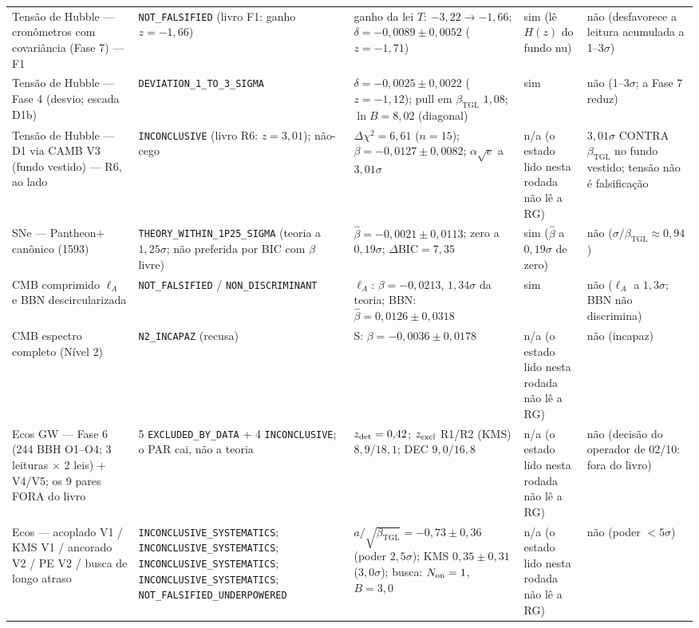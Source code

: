 \documentclass[11pt]{article}
\newcommand{\bTGL}{\beta_{\mathrm{TGL}}}\newcommand{\Msun}{M_{\odot}}\newcommand{\TGL}{\mathrm{TGL}}
\theoremstyle{definition}\newtheorem{deriv}{Derivação}
\begin{document}
\begin{footnotesize}
\begin{longtable}{@{}p{}p{}p{}p{}p{}@{}}
Tensão de Hubble --- cronômetros com covariância (Fase 7) --- F1 & \texttt{NOT\_\allowbreak{}FALSIFIED} (livro F1: ganho $z=-1{,}66$) & ganho da lei $T$: $-3{,}22\to-1{,}66$; $\delta=-0{,}0089\pm0{,}0052$ ($z=-1{,}71$) & sim (lê $H(z)$ do fundo nu) & não (desfavorece a leitura acumulada a 1--3$\sigma$) \\
Tensão de Hubble --- Fase 4 (desvio; escada D1b) & \texttt{DEVIATION\_\allowbreak{}1\_\allowbreak{}TO\_\allowbreak{}3\_\allowbreak{}SIGMA} & $\delta=-0{,}0025\pm0{,}0022$ ($z=-1{,}12$); pull em $\bTGL$ $1{,}08$; $\ln B=8{,}02$ (diagonal) & sim & não (1--3$\sigma$; a Fase 7 reduz) \\
Tensão de Hubble --- D1 via CAMB V3 (fundo vestido) --- R6, ao lado & \texttt{INCONCLUSIVE} (livro R6: $z=3{,}01$); não-cego & $\Delta\chi^2=6{,}61$ ($n=15$); $\beta=-0{,}0127\pm0{,}0082$; $\alpha\sqrt e$ a $3{,}01\sigma$ & n/a (o estado lido nesta rodada não lê a RG) & $3{,}01\sigma$ CONTRA $\bTGL$ no fundo vestido; tensão não é falsificação \\
SNe --- Pantheon+ canônico (1593) & \texttt{THEORY\_\allowbreak{}WITHIN\_\allowbreak{}1P25\_\allowbreak{}SIGMA} (teoria a $1{,}25\sigma$; não preferida por BIC com $\beta$ livre) & $\hat\beta=-0{,}0021\pm0{,}0113$; zero a $0{,}19\sigma$; $\Delta\mathrm{BIC}=7{,}35$ & sim ($\hat\beta$ a $0{,}19\sigma$ de zero) & não ($\sigma/\bTGL\approx0{,}94$) \\
CMB comprimido $\ell_A$ e BBN descircularizada & \texttt{NOT\_\allowbreak{}FALSIFIED} / \texttt{NON\_\allowbreak{}DISCRIMINANT} & $\ell_A$: $\beta=-0{,}0213$, $1{,}34\sigma$ da teoria; BBN: $\hat\beta=0{,}0126\pm0{,}0318$ & sim & não ($\ell_A$ a $1{,}3\sigma$; BBN não discrimina) \\
CMB espectro completo (Nível 2) & \texttt{N2\_\allowbreak{}INCAPAZ} (recusa) & S: $\beta=-0{,}0036\pm0{,}0178$ & n/a (o estado lido nesta rodada não lê a RG) & não (incapaz) \\
Ecos GW --- Fase 6 (244 BBH O1--O4; 3 leituras $\times$ 2 leis) + V4/V5; os 9 pares FORA do livro & 5 \texttt{EXCLUDED\_BY\_DATA} + 4 \texttt{INCONCLUSIVE}; o PAR cai, não a teoria & $z_{\rm det}=0{,}42$; $z_{\rm excl}$ R1/R2 (KMS) $8{,}9$/$18{,}1$; DEC $9{,}0$/$16{,}8$ & n/a (o estado lido nesta rodada não lê a RG) & não (decisão do operador de 02/10: fora do livro) \\
Ecos --- acoplado V1 / KMS V1 / ancorado V2 / PE V2 / busca de longo atraso & \texttt{INCONCLUSIVE\_\allowbreak{}SYSTEMATICS}; \texttt{INCONCLUSIVE\_\allowbreak{}SYSTEMATICS}; \texttt{INCONCLUSIVE\_\allowbreak{}SYSTEMATICS}; \texttt{INCONCLUSIVE\_\allowbreak{}SYSTEMATICS}; \texttt{NOT\_\allowbreak{}FALSIFIED\_\allowbreak{}UNDERPOWERED} & $a/\sqrt{\bTGL}=-0{,}73\pm0{,}36$ (poder $2{,}5\sigma$); KMS $0{,}35\pm0{,}31$ ($3{,}0\sigma$); busca: $N_{\rm on}=1$, $B=3{,}0$ & n/a (o estado lido nesta rodada não lê a RG) & não (poder $<5\sigma$) \\

\end{longtable}
\end{footnotesize}
\end{document}
